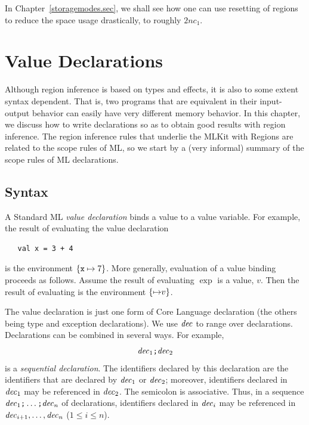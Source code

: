 \documentclass[12pt]{book}
\begin{document}
In Chapter~\ref{storagemodes.sec}, we shall see how one can use
resetting of regions to reduce the space usage drastically, to roughly
$2nc_1$.  
%

\chapter{Value Declarations}
\label{valdecl.sec}

Although region inference is based on types and effects, it is also to
some extent syntax dependent. That is, two programs that are
equivalent in their input-output behavior can easily have very
different memory behavior. In this chapter, we discuss how to write
%
declarations so as to obtain good results with region inference. The
region inference rules that underlie the MLKit with Regions are
related to the scope rules of ML, so we start by a (very informal)
summary of the scope rules of ML declarations.

\section{Syntax}
A Standard ML {\em value declaration} binds a value to a value
%
variable. For example, the result of evaluating the value declaration
\begin{verbatim}
   val x = 3 + 4
\end{verbatim}
is the 
%
environment $\{\hbox{\tt x}\mapsto 7\}$. More generally, evaluation of a
value binding  proceeds as follows. Assume
the result of evaluating $\exp$ is a value, $v$.  Then the result of
evaluating  is the environment $\{{\it \mapsto}
v\}$.

The value declaration is just one form of Core Language declaration 
(the others being type and exception declarations). We use ${\it dec}$ to
range over declarations. Declarations can be
combined in several ways. For example, 
%
$${\it dec}_1\hbox{\tt ;}{\it dec}_2$$
is a {\em sequential declaration}. The
identifiers declared by this declaration are the identifiers that are
declared by ${\it dec}_1$ or ${\it dec}_2$; moreover, identifiers declared in
${\it dec}_1$ may be referenced in ${\it dec}_2$. The
%
semicolon is associative. Thus, in a sequence
${\it dec}_1\hbox{\tt ;}\ldots\hbox{\tt ;}{\it dec}_n$ of declarations, identifiers
declared in ${\it dec}_i$ may be referenced in ${\it dec}_{i+1},\ldots ,{\it dec}_n$
($1\leq i\leq n$).
\end{document}
